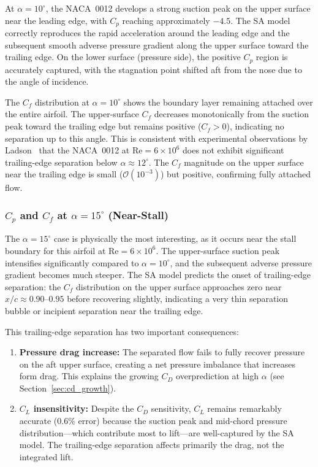 \documentclass[11pt,a4paper]{article}
\begin{document}
At $\alpha = 10^\circ$, the NACA~0012 develops a strong suction peak on the
upper surface near the leading edge, with $C_p$ reaching approximately $-4.5$.
The SA model correctly reproduces the rapid acceleration around the leading
edge and the subsequent smooth adverse pressure gradient along the upper
surface toward the trailing edge.  On the lower surface (pressure side), the
positive $C_p$ region is accurately captured, with the stagnation point
shifted aft from the nose due to the angle of incidence.

The $C_f$ distribution at $\alpha = 10^\circ$ shows the boundary layer
remaining attached over the entire airfoil.  The upper-surface $C_f$
decreases monotonically from the suction peak toward the trailing edge but
remains positive ($C_f > 0$), indicating no separation up to this angle.
This is consistent with experimental observations by
Ladson~\cite{Ladson1988} that the NACA~0012 at $\text{Re} = 6{\times}10^6$
does not exhibit significant trailing-edge separation below
$\alpha \approx 12^\circ$.  The $C_f$ magnitude on the upper surface near
the trailing edge is small ($\mathcal{O}(10^{-3})$) but positive,
confirming fully attached flow.

\subsubsection{$C_p$ and $C_f$ at $\alpha = 15^\circ$ (Near-Stall)}

The $\alpha = 15^\circ$ case is physically the most interesting, as it
occurs near the stall boundary for this airfoil at
$\text{Re} = 6{\times}10^6$.  The upper-surface suction peak intensifies
significantly compared to $\alpha = 10^\circ$, and the subsequent adverse
pressure gradient becomes much steeper.  The SA model predicts the onset of
trailing-edge separation: the $C_f$ distribution on the upper surface
approaches zero near $x/c \approx 0.90$--$0.95$ before recovering slightly,
indicating a very thin separation bubble or incipient separation near the
trailing edge.

This trailing-edge separation has two important consequences:
\begin{enumerate}
  \item \textbf{Pressure drag increase:} The separated flow fails to fully
    recover pressure on the aft upper surface, creating a net pressure
    imbalance that increases form drag.  This explains the growing $C_D$
    overprediction at high $\alpha$
    (see Section~\ref{sec:cd_growth}).
  \item \textbf{$C_L$ insensitivity:} Despite the $C_D$ sensitivity, $C_L$
    remains remarkably accurate ($0.6\%$ error) because the suction peak
    and mid-chord pressure distribution---which contribute most to
    lift---are well-captured by the SA model.  The trailing-edge separation
    affects primarily the drag, not the integrated lift.
\end{enumerate}
\end{document}
